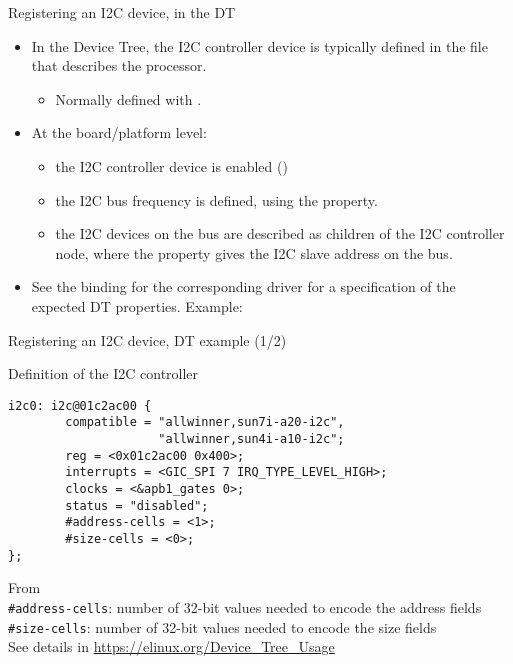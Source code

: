 \begin{frame}{Registering an I2C device, in the DT}
  \begin{itemize}
  \item In the Device Tree, the I2C controller device is typically
    defined in the  file that describes the processor.
    \begin{itemize}
    \item Normally defined with .
    \end{itemize}
  \item At the board/platform level:
    \begin{itemize}
    \item the I2C controller device is enabled
      ()
    \item the I2C bus frequency is defined, using the
       property.
    \item the I2C devices on the bus are described as children of the
      I2C controller node, where the  property gives the I2C
      slave address on the bus.
    \end{itemize}
   \item See the binding for the corresponding driver for a
      specification of the expected DT properties. Example:
  \end{itemize}
\end{frame}

\begin{frame}[fragile]{Registering an I2C device, DT example (1/2)}
  \begin{block}{Definition of the I2C controller}
    \begin{verbatim}
i2c0: i2c@01c2ac00 {
        compatible = "allwinner,sun7i-a20-i2c",
                     "allwinner,sun4i-a10-i2c";
        reg = <0x01c2ac00 0x400>;
        interrupts = <GIC_SPI 7 IRQ_TYPE_LEVEL_HIGH>;
        clocks = <&apb1_gates 0>;
        status = "disabled";
        #address-cells = <1>;
        #size-cells = <0>;
};
    \end{verbatim}
  \end{block}
  \small
  From \\
  \vspace{0.5cm}
  {\tt \#address-cells}: number of 32-bit values needed to encode the address fields\\
  {\tt \#size-cells}: number of 32-bit values needed to encode the size fields\\
  See details in \url{https://elinux.org/Device_Tree_Usage}
\end{frame}

